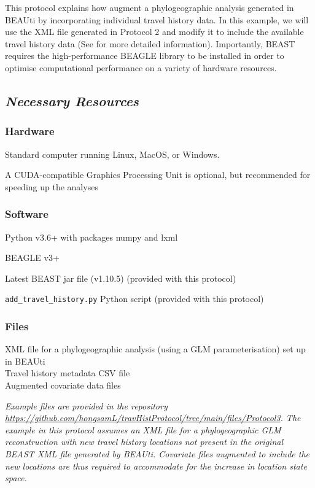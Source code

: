 \documentclass{article}
\newcommand{\ann}[1]{
\begin{adjustwidth}{0.5cm}{}
\it{#1}\\
\end{adjustwidth}}
\begin{document}
This protocol explains how augment a phylogeographic analysis generated in BEAUti by incorporating individual travel history data.
In this example, we will use the XML file generated in Protocol 2 and modify it to include the available travel history data (See \cite{travhist} for more detailed information).
Importantly, BEAST requires the high-performance BEAGLE library \cite{beagle3} to be installed in order to optimise computational performance on a variety of hardware resources.

\subsection*{\textbf{\textit{Necessary Resources}}}
\subsubsection*{Hardware}
\hspace{0.5cm}Standard computer running Linux, MacOS, or Windows.

\hspace{0.5cm}A CUDA-compatible Graphics Processing Unit is optional, but recommended for speeding up the analyses

\subsubsection*{Software}
\hspace{0.5cm}Python v3.6+ with packages numpy and lxml

\hspace{0.5cm}BEAGLE v3+

\hspace{0.5cm}Latest BEAST jar file (v1.10.5) (provided with this protocol)

\hspace{0.5cm}\verb|add_travel_history.py| Python script (provided with this protocol)

\subsubsection*{Files}
XML file for a phylogeographic analysis (using a GLM  parameterisation) set up in BEAUti \\
Travel history metadata CSV file \\
Augmented covariate data files \\

\ann{Example files are provided in the repository {\upshape\url{https://github.com/hongsamL/travHistProtocol/tree/main/files/Protocol3}}. %
The example in this protocol assumes an XML file for a phylogeographic GLM reconstruction with new travel history locations not present in the original BEAST XML file generated by BEAUti.
Covariate files augmented to include the new locations are thus required to accommodate for the increase in location state space.}
\end{document}
